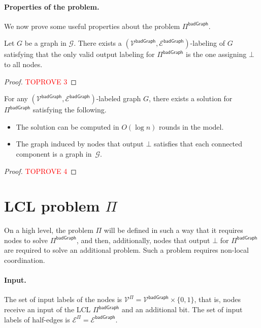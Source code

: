 \documentclass[11pt]{article}
\newcommand{\lbadgraph}{\mathsf {badGraph}}
\begin{document}
\paragraph{Properties of the problem.}
We now prove some useful properties about the problem $\Pi^{\lbadgraph}$.
\begin{lemma}\label{lem:badgraph-bot-everywhere}
	Let $G$ be a graph in $\mathcal{G}$. There exists a $(\mathcal{V^\lbadgraph},\mathcal{E^\lbadgraph})$-labeling of $G$ satisfying that the only valid output labeling for $\Pi^{\lbadgraph}$ is the one assigning $\bot$ to all nodes.
\end{lemma}
\begin{proof}\textcolor{red}{TOPROVE 3}\end{proof}
\begin{lemma}\label{lem:solve-badgraph}
	For any $(\mathcal{V^\lbadgraph},\mathcal{E^\lbadgraph})$-labeled graph $G$, there exists a solution for $\Pi^{\lbadgraph}$ satisfying the following.
	\begin{itemize}[noitemsep]
		\item The solution can be computed in $O(\log n)$ rounds in the \local model.
		\item The graph induced by nodes that output $\bot$ satisfies that each connected component is a graph in~$\mathcal{G}$.
	\end{itemize}
\end{lemma}
\begin{proof}\textcolor{red}{TOPROVE 4}\end{proof}

\section{LCL problem \texorpdfstring{\boldmath$\Pi$}{Pi}}\label{sec:problem-pi}
On a high level, the problem $\Pi$ will be defined in such a way that it requires nodes to solve $\Pi^{\lbadgraph}$, and then, additionally, nodes that output $\bot$ for $\Pi^{\lbadgraph}$ are required to solve an additional problem. Such a problem requires non-local coordination.

\paragraph{Input.}
The set of input labels of the nodes is $\mathcal{V}^\Pi=\mathcal{V^\lbadgraph}\times \{0,1\}$, that is, nodes receive an input of the LCL $\Pi^\lbadgraph$ and an additional bit. The set of input labels of half-edges is $\mathcal{E}^\Pi=\mathcal{E^\lbadgraph}$. 
\end{document}
